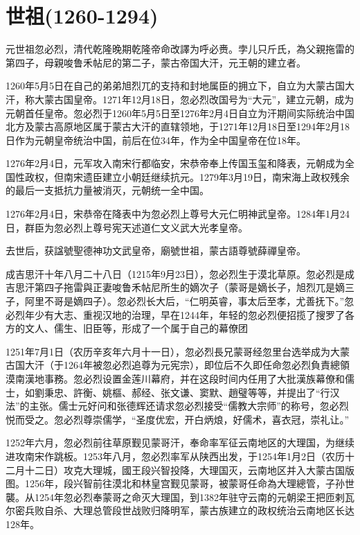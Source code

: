 
\section{世祖\tiny(1260-1294)}

元世祖忽必烈，清代乾隆晚期乾隆帝命改譯为呼必赉。孛儿只斤氏，為父親拖雷的第四子，母親唆鲁禾帖尼的第二子，蒙古帝国大汗，元王朝的建立者。

1260年5月5日在自己的弟弟旭烈兀的支持和封地属臣的拥立下，自立为大蒙古国大汗，称大蒙古国皇帝。1271年12月18日，忽必烈改国号为“大元”，建立元朝，成为元朝首任皇帝。忽必烈于1260年5月5日至1276年2月4日自立为汗期间实际统治中国北方及蒙古高原地区属于蒙古大汗的直辖领地，于1271年12月18日至1294年2月18日作为元朝皇帝统治中国，前后在位34年，作为全中国皇帝在位18年。

1276年2月4日，元军攻入南宋行都临安，宋恭帝奉上传国玉玺和降表，元朝成为全国性政权，但南宋遗臣建立小朝廷继续抗元。1279年3月19日，南宋海上政权残余的最后一支抵抗力量被消灭，元朝统一全中国。

1276年2月4日，宋恭帝在降表中为忽必烈上尊号大元仁明神武皇帝。1284年1月24日，群臣为忽必烈上尊号宪天述道仁文义武大光孝皇帝。

去世后，获諡號聖德神功文武皇帝，廟號世祖，蒙古語尊號薛禪皇帝。

成吉思汗十年八月二十八日（1215年9月23日），忽必烈生于漠北草原。忽必烈是成吉思汗第四子拖雷與正妻唆鲁禾帖尼所生的嫡次子（蒙哥是嫡长子，旭烈兀是嫡三子，阿里不哥是嫡四子）。忽必烈长大后，“仁明英睿，事太后至孝，尤善抚下。”忽必烈年少有大志、重视汉地的治理，早在1244年，年轻的忽必烈便招揽了搜罗了各方的文人、儒生、旧臣等，形成了一个属于自己的幕僚团

1251年7月1日（农历辛亥年六月十一日），忽必烈長兄蒙哥经忽里台选举成为大蒙古国大汗（于1264年被忽必烈追尊为元宪宗），即位后不久即任命忽必烈負責總領漠南漢地事務。忽必烈设置金莲川幕府，并在这段时间内任用了大批漢族幕僚和儒士，如劉秉忠、許衡、姚樞、郝经、张文谦、窦默、趙璧等等，并提出了“行汉法”的主张。儒士元好问和张德辉还请求忽必烈接受“儒教大宗师”的称号，忽必烈悦而受之。忽必烈尊崇儒学，“圣度优宏，开白炳烺，好儒术，喜衣冠，崇礼让。”

1252年六月，忽必烈前往草原觐见蒙哥汗，奉命率军征云南地区的大理国，为继续进攻南宋作跳板。1253年八月，忽必烈率军从陕西出发，于1254年1月2日（农历十二月十二日）攻克大理城，國王段兴智投降，大理国灭，云南地区并入大蒙古国版图。1256年，段兴智前往漠北和林皇宫觐见蒙哥，被蒙哥任命為大理總管，子孙世襲。从1254年忽必烈奉蒙哥之命灭大理国，到1382年驻守云南的元朝梁王把匝剌瓦尔密兵败自杀、大理总管段世战败归降明军，蒙古族建立的政权统治云南地区长达128年。

